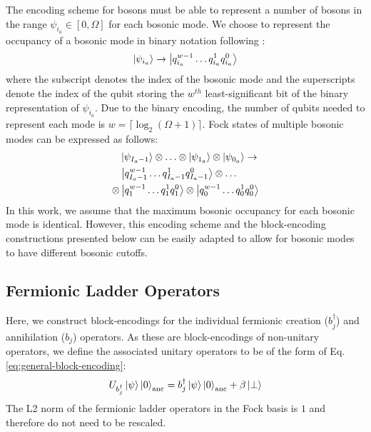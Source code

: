 The encoding scheme for bosons must be able to represent a number of bosons in the range $\psi_{i_a} \in [0, \Omega]$ for each bosonic mode.
We choose to represent the occupancy of a bosonic mode in binary notation following \cite{rhodes2024exponential}:
\begin{equation}
    \ket{\psi_{i_a}} \rightarrow \ket{q_{i_a}^{w-1} \hdots q_{i_a}^{1} q_{i_a}^0}
\end{equation}
where the subscript denotes the index of the bosonic mode and the superscripts denote the index of the qubit storing the $w^{th}$ least-significant bit of the binary representation of $\psi_{i_a}$.
Due to the binary encoding, the number of qubits needed to represent each mode is $w = \lceil \log_2{(\Omega + 1)} \rceil$.
Fock states of multiple bosonic modes can be expressed as follows:
\begin{equation}
    \begin{split}
        &\ket{\psi_{I_a - 1}} \otimes \hdots \otimes \ket{\psi_{1_a}} \otimes \ket{\psi_{0_a}} \rightarrow \\
        &\ket{q_{I_a - 1}^{w-1} \hdots q_{I_a - 1}^{1} q_{I_a - 1}^0} \otimes \hdots \\
        \otimes &\ket{q_{1}^{w-1} \hdots q_{1}^{1} q_{1}^0} \otimes \ket{q_{0}^{w-1} \hdots q_{0}^{1} q_{0}^0} \\
    \end{split}
\end{equation}
In this work, we assume that the maximum bosonic occupancy for each bosonic mode is identical.
However, this encoding scheme and the block-encoding constructions presented below can be easily adapted to allow for bosonic modes to have different bosonic cutoffs.

\subsection{Fermionic Ladder Operators}
\label{subsec:fermionic-be}

Here, we construct block-encodings for the individual fermionic creation ($b_j^\dagger$) and annihilation ($b_j$) operators.
As these are block-encodings of non-unitary operators, we define the associated unitary operators to be of the form of Eq. \ref{eq:general-block-encoding}:
\begin{equation}
    U_{b^\dagger_j} \ket{\psi} \ket{0}_\text{anc} = b^\dagger_j \ket{\psi}\ket{0}_\text{anc} + \beta \ket{\perp}
\end{equation}
The L2 norm of the fermionic ladder operators in the Fock basis is $1$ and therefore do not need to be rescaled.

